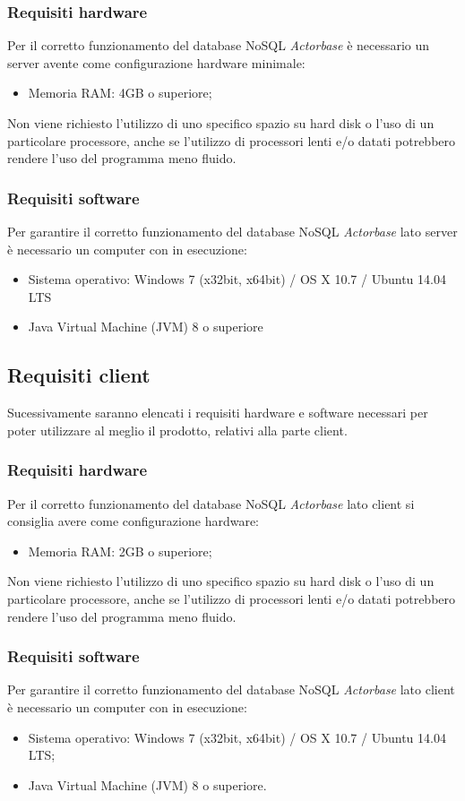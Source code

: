 \documentclass[a4paper]{article}
\begin{document}
			\subsubsection{Requisiti hardware}
			Per il corretto funzionamento del database NoSQL \emph{Actorbase} è necessario un server avente come configurazione hardware minimale:
			\begin{itemize}
				\item Memoria RAM: 4GB o superiore;
			\end{itemize}
			Non viene richiesto l'utilizzo di uno specifico spazio su hard disk o l'uso di un particolare processore, anche se l'utilizzo di processori lenti e/o datati potrebbero rendere l'uso del programma meno fluido. 
			\subsubsection{Requisiti software}
			Per garantire il corretto funzionamento del database NoSQL \emph{Actorbase} lato server è necessario un computer con in esecuzione: 
			\begin{itemize}
				\item Sistema operativo: Windows 7 (x32bit, x64bit) / OS X 10.7 / Ubuntu 14.04 LTS
				\item Java Virtual Machine (JVM) 8 o superiore
			\end{itemize}
			\subsection{Requisiti client}
			Sucessivamente saranno elencati i requisiti hardware e software necessari per poter utilizzare al meglio il prodotto, relativi alla parte client.
			\subsubsection{Requisiti hardware}
			Per il corretto funzionamento del database NoSQL \emph{Actorbase} lato client si consiglia avere come configurazione hardware:
			\begin{itemize}
				\item Memoria RAM: 2GB o superiore;
			\end{itemize}
			Non viene richiesto l'utilizzo di uno specifico spazio su hard disk o l'uso di un particolare processore, anche se l'utilizzo di processori lenti e/o datati potrebbero rendere l'uso del programma meno fluido. 
			\subsubsection{Requisiti software}
			Per garantire il corretto funzionamento del database NoSQL \emph{Actorbase} lato client è necessario un computer con in esecuzione: 
			\begin{itemize}
				\item Sistema operativo: Windows 7 (x32bit, x64bit) / OS X 10.7 / Ubuntu 14.04 LTS;
				\item Java Virtual Machine (JVM) 8 o superiore.
			\end{itemize}
\end{document}
